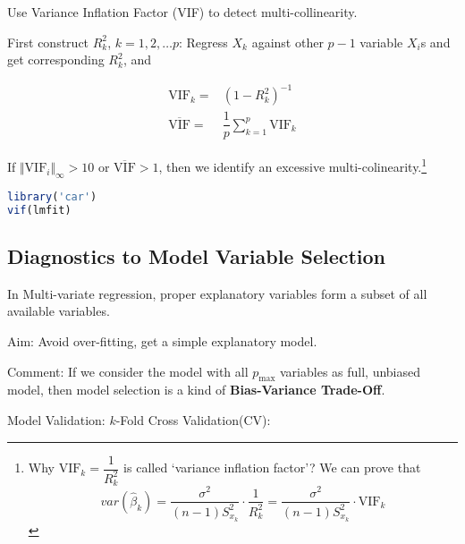 \begin{point}
    Use Variance Inflation Factor (VIF) to detect multi-collinearity.
\end{point}    

    First construct $ R^2_k $, $ k=1,2,\ldots p $: Regress $ X_k $ against other $ p-1 $ variable $ X_i $s and get corresponding $ R^2_k $, and 

    \begin{align}
        \mathrm{VIF}_k=&(1-R^2_k)^{-1}\\
        \overline{\mathrm{VIF}} =&\dfrac{1}{p}\sum_{k=1}^p\mathrm{VIF}_k 
    \end{align}

    
    If $ \Vert \mathrm{VIF}_i\Vert _{\infty}>10 $ or $ \overline{\mathrm{VIF}}> 1 $, then we identify an excessive multi-colinearity.\footnote{Why $ \mathrm{VIF}_k=\dfrac{1}{R_k^2}  $ is called `variance inflation factor'? We can prove that 
\begin{equation}
    var(\hat{\beta }_k)=\dfrac{\sigma ^2}{(n-1)S_{x_k}^2}\cdot \dfrac{1}{R_k^2}= \dfrac{\sigma ^2}{(n-1)S_{x_k}^2}\cdot \mathrm{VIF}_k
\end{equation}

}

\begin{rcode}
\begin{lstlisting}[language=R]
library('car')
vif(lmfit)
\end{lstlisting}
\end{rcode}
    
    

    
\subsection{Diagnostics to Model Variable Selection}

        In Multi-variate regression, proper explanatory variables form a subset of all available variables.

        Aim: Avoid over-fitting, get a simple explanatory model.

        Comment: If we consider the model with all $ p_\mathrm{max} $ variables as full, unbiased model, then model selection is a kind of \textbf{Bias-Variance Trade-Off}. 

\begin{point}
    Model Validation: $ k $-Fold Cross Validation(CV): 

\end{point}

